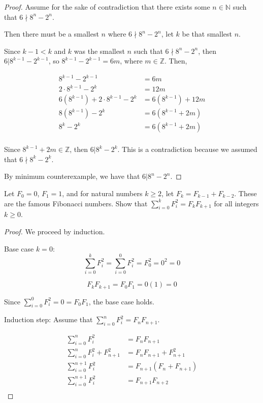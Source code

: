 \documentclass[12 pt]{exam}
\begin{document}
\begin{questions}
\begin{solution}
\begin{proof}
Assume for the sake of contradiction that there exists some $n \in \mathbb{N}$ such that $6 \nmid 8^n - 2^n$.

Then there must be a smallest $n$ where $6 \nmid 8^n - 2^n$, let $k$ be that smallest $n$.

Since $k-1 < k$ and $k$ was the smallest $n$ such that $6 \nmid 8^n - 2^n$, then $6 | 8^{k-1} - 2^{k-1}$,
so $8^{k-1} - 2^{k-1} = 6m$, where $m \in \mathbb{Z}$. Then,

\begin{align*}
    8^{k-1} - 2^{k-1} &= 6m\\
    2 \cdot 8^{k-1} - 2^k &= 12m\\
    6 (8^{k-1}) + 2 \cdot 8^{k-1} - 2^{k} &= 6 (8^{k-1}) + 12m\\
    8(8^{k-1}) - 2^{k} &= 6 (8^{k-1} + 2m)\\
    8^{k} - 2^{k} &= 6 (8^{k-1} + 2m)\\
\end{align*}

Since $8^{k-1} + 2m \in \mathbb{Z}$, then $6 | 8^{k} - 2^k$. This is a contradiction because we assumed that
$6 \nmid 8^k - 2^k$.

By minimum counterexample, we have that $6 | 8^n - 2^n$.
\end{proof}\end{solution}




\question Let $F_0 = 0$, $F_1 = 1$, and for natural numbers $k \geq 2$, let $F_k = F_{k-1} + F_{k-2}$. These are the famous Fibonacci numbers.  Show that $\sum_{i=0}^k F_i^2 = F_k F_{k+1}$ for all integers $k \geq 0$. 

\begin{solution}\begin{proof}
We proceed by induction.

Base case $k=0$:
$$\sum_{i=0}^k F_i^2 = \sum_{i=0}^0 F_i^2 = F_0^2 = 0^2 = 0$$

$$F_k F_{k+1} = F_0 F_1 = 0 (1) = 0$$

Since $\sum_{i=0}^0 F_i^2 = 0 = F_0 F_1$, the base case holds.

Induction step: Assume that $\sum_{i=0}^n F_i^2 = F_n F_{n+1}$.

\begin{align*}
    \sum_{i=0}^n F_i^2 &= F_n F_{n+1} \\
    \sum_{i=0}^n F_i^2 + F_{n+1}^2 &= F_n F_{n+1} + F_{n+1}^2 \\
    \sum_{i=0}^{n+1} F_i^2  &= F_{n+1} (F_n + F_{n+1}) \\
    \sum_{i=0}^{n+1} F_i^2  &= F_{n+1} F_{n+2} \\
\end{align*}


\end{proof}
\end{solution}
\end{questions}
\end{document}

